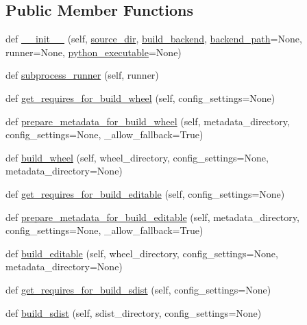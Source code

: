 \subsection*{Public Member Functions}
\begin{DoxyCompactItemize}
\item 
def \hyperlink{classpip_1_1__vendor_1_1pep517_1_1wrappers_1_1Pep517HookCaller_a643ba58253daacef75db41d4f7103b00}{\+\_\+\+\_\+init\+\_\+\+\_\+} (self, \hyperlink{classpip_1_1__vendor_1_1pep517_1_1wrappers_1_1Pep517HookCaller_aab251dbd969837d76cc2849517a313e9}{source\+\_\+dir}, \hyperlink{classpip_1_1__vendor_1_1pep517_1_1wrappers_1_1Pep517HookCaller_aa13c5b77e490ae5cff1e4a23f8eefcea}{build\+\_\+backend}, \hyperlink{classpip_1_1__vendor_1_1pep517_1_1wrappers_1_1Pep517HookCaller_a839e0732ae080d960a35a3bff7b9cc44}{backend\+\_\+path}=None, runner=None, \hyperlink{classpip_1_1__vendor_1_1pep517_1_1wrappers_1_1Pep517HookCaller_a19489e9fe7ff61c15c82fe53d0abdd2b}{python\+\_\+executable}=None)
\item 
def \hyperlink{classpip_1_1__vendor_1_1pep517_1_1wrappers_1_1Pep517HookCaller_a935d5063d39b46ecf8e100a34dee4fb6}{subprocess\+\_\+runner} (self, runner)
\item 
def \hyperlink{classpip_1_1__vendor_1_1pep517_1_1wrappers_1_1Pep517HookCaller_a2024c5e308c0cf759131429d9fab77ee}{get\+\_\+requires\+\_\+for\+\_\+build\+\_\+wheel} (self, config\+\_\+settings=None)
\item 
def \hyperlink{classpip_1_1__vendor_1_1pep517_1_1wrappers_1_1Pep517HookCaller_a0d16360f48a848001b3d0890220f6709}{prepare\+\_\+metadata\+\_\+for\+\_\+build\+\_\+wheel} (self, metadata\+\_\+directory, config\+\_\+settings=None, \+\_\+allow\+\_\+fallback=True)
\item 
def \hyperlink{classpip_1_1__vendor_1_1pep517_1_1wrappers_1_1Pep517HookCaller_ac358ca6492dc774ff3e1abd11fcc2215}{build\+\_\+wheel} (self, wheel\+\_\+directory, config\+\_\+settings=None, metadata\+\_\+directory=None)
\item 
def \hyperlink{classpip_1_1__vendor_1_1pep517_1_1wrappers_1_1Pep517HookCaller_a95d6f62ffabd69892c89e4708a50fc1e}{get\+\_\+requires\+\_\+for\+\_\+build\+\_\+editable} (self, config\+\_\+settings=None)
\item 
def \hyperlink{classpip_1_1__vendor_1_1pep517_1_1wrappers_1_1Pep517HookCaller_a62e4be46365e6b164be9c18ad2ed8edc}{prepare\+\_\+metadata\+\_\+for\+\_\+build\+\_\+editable} (self, metadata\+\_\+directory, config\+\_\+settings=None, \+\_\+allow\+\_\+fallback=True)
\item 
def \hyperlink{classpip_1_1__vendor_1_1pep517_1_1wrappers_1_1Pep517HookCaller_a666eaf0a756b3380193153877c1dae77}{build\+\_\+editable} (self, wheel\+\_\+directory, config\+\_\+settings=None, metadata\+\_\+directory=None)
\item 
def \hyperlink{classpip_1_1__vendor_1_1pep517_1_1wrappers_1_1Pep517HookCaller_a9743026ea00e63558911128cf6720fa0}{get\+\_\+requires\+\_\+for\+\_\+build\+\_\+sdist} (self, config\+\_\+settings=None)
\item 
def \hyperlink{classpip_1_1__vendor_1_1pep517_1_1wrappers_1_1Pep517HookCaller_a487eb1b2488381ed3608d938621cee31}{build\+\_\+sdist} (self, sdist\+\_\+directory, config\+\_\+settings=None)
\end{DoxyCompactItemize}
